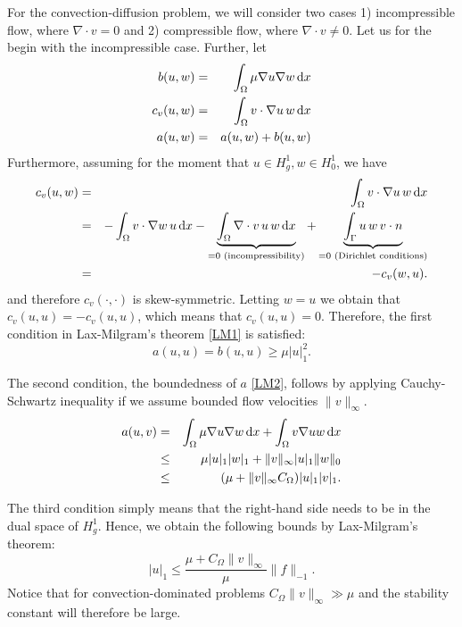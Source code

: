 For the convection-diffusion problem, we will consider two cases 1) incompressible flow, where
$\nabla \cdot v = 0 $ and 2) compressible flow, where $\nabla \cdot v \not = 0 $.  
Let us for the begin with the incompressible case.  
Further, let 
\begin{eqnarray*}
b(u,w) &=& \int_\Omega\mu\nabla u\nabla w \, \mathrm{d}x\\
c_v(u,w) &=& \int_\Omega v \cdot \nabla u \,w \, \mathrm{d}x\\
a(u,w) &=& a(u,w) + b(u,w)\\
\end{eqnarray*}
Furthermore, assuming for the moment that $u \in H^1_g, w\in H^1_0$, we have  
\begin{eqnarray*}
c_v(u,w) &=& \int_\Omega v\cdot \nabla u\, w \, \mathrm{d}x  \\ 
         &=&-\int_\Omega v\cdot \nabla w \, u \, \mathrm{d}x 
- \underbrace{\int_\Omega \nabla \cdot v \, u \, w \, \mathrm{d}x}_{= 0 \textrm{ (incompressibility)}} 
+ \underbrace{\int_\Gamma u \, w \, v \cdot n}_{ = 0  \textrm{ (Dirichlet conditions)}} \\       
         &=& - c_v(w,u) . 
\end{eqnarray*}
and therefore $c_v(\cdot, \cdot)$ is skew-symmetric. Letting $w=u$ we obtain that   
$c_v(u,u) = -c_v(u,u)$, which means that $c_v(u,u)=0$. 
Therefore, the first condition in Lax-Milgram's theorem \eqref{LM1} is satisfied:   
\[  
a(u,u) = b(u,u) \ge \mu |u|_1^2 .  
\]

The second condition, the boundedness of $a$ \eqref{LM2}, follows by applying Cauchy-Schwartz inequality
if we assume bounded flow velocities $\|v\|_{\infty}$.  
\begin{eqnarray*}
a(u,v) &=& \int_\Omega\mu\nabla u\nabla w \, \mathrm{d}x + \int_\Omega v\nabla uw \, \mathrm{d}x\\
       &\le& \mu |u|_1 |w|_1  + \|v\|_{\infty} |u|_1 \|w\|_0 \\   
       &\le& (\mu + \|v\|_{\infty} C_\Omega )  |u|_1 |v|_1 .    
\end{eqnarray*}

The third condition simply means that the right-hand side needs to be in the dual 
space of $H^1_g$. Hence, we obtain the following bounds by Lax-Milgram's theorem:   
\[
|u|_1 \le \frac{ \mu + C_\Omega \|v\|_{\infty}}{\mu} \|f\|_{-1} . 
\]
Notice that for convection-dominated problems $ C_\Omega \|v\|_{\infty} \gg \mu$ 
and the stability constant will therefore be large. 

